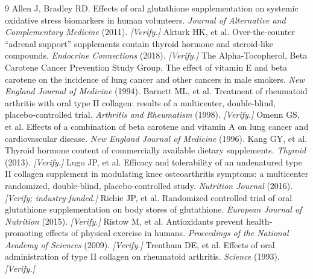 \documentclass[11pt,a4paper]{article}
\theoremstyle{plain}
\theoremstyle{definition}
\theoremstyle{remark}
\begin{document}
\begin{thebibliography}{9}
\small
{} Allen J, Bradley RD. Effects of oral glutathione supplementation on systemic oxidative stress biomarkers in human volunteers. \emph{Journal of Alternative and Complementary Medicine} (2011). \emph{[Verify.]}
 Akturk HK, et al. Over-the-counter ``adrenal support'' supplements contain thyroid hormone and steroid-like compounds. \emph{Endocrine Connections} (2018). \emph{[Verify.]}
 The Alpha-Tocopherol, Beta Carotene Cancer Prevention Study Group. The effect of vitamin E and beta carotene on the incidence of lung cancer and other cancers in male smokers. \emph{New England Journal of Medicine} (1994).
 Barnett ML, et al. Treatment of rheumatoid arthritis with oral type II collagen: results of a multicenter, double-blind, placebo-controlled trial. \emph{Arthritis and Rheumatism} (1998). \emph{[Verify.]}
 Omenn GS, et al. Effects of a combination of beta carotene and vitamin A on lung cancer and cardiovascular disease. \emph{New England Journal of Medicine} (1996).
 Kang GY, et al. Thyroid hormone content of commercially available dietary supplements. \emph{Thyroid} (2013). \emph{[Verify.]}
 Lugo JP, et al. Efficacy and tolerability of an undenatured type II collagen supplement in modulating knee osteoarthritis symptoms: a multicenter randomized, double-blind, placebo-controlled study. \emph{Nutrition Journal} (2016). \emph{[Verify; industry-funded.]}
 Richie JP, et al. Randomized controlled trial of oral glutathione supplementation on body stores of glutathione. \emph{European Journal of Nutrition} (2015). \emph{[Verify.]}
 Ristow M, et al. Antioxidants prevent health-promoting effects of physical exercise in humans. \emph{Proceedings of the National Academy of Sciences} (2009). \emph{[Verify.]}
 Trentham DE, et al. Effects of oral administration of type II collagen on rheumatoid arthritis. \emph{Science} (1993). \emph{[Verify.]}
\end{thebibliography}
\end{document}
